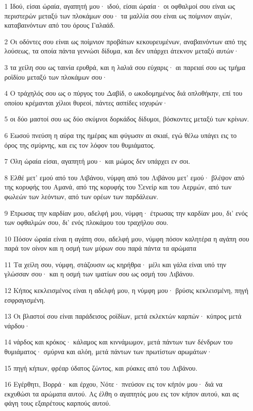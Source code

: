 \par 1 Ιδού, είσαι ώραία, αγαπητή μου· ιδού, είσαι ώραία· οι οφθαλμοί σου είναι ως περιστερών μεταξύ των πλοκάμων σου· τα μαλλία σου είναι ως ποίμνιον αιγών, καταβαινόντων από του όρους Γαλαάδ.
\par 2 Οι οδόντες σου είναι ως ποίμνιον προβάτων κεκουρευμένων, αναβαινόντων από της λούσεως, τα οποία πάντα γεννώσι δίδυμα, και δεν υπάρχει άτεκνον μεταξύ αυτών·
\par 3 τα χείλη σου ως ταινία ερυθρά, και η λαλιά σου εύχαρις· αι παρειαί σου ως τμήμα ροϊδίου μεταξύ των πλοκάμων σου·
\par 4 Ο τράχηλός σου ως ο πύργος του Δαβίδ, ο ωκοδομημένος διά οπλοθήκην, επί του οποίου κρέμανται χίλιοι θυρεοί, πάντες ασπίδες ισχυρών·
\par 5 οι δύο μαστοί σου ως δύο σκύμνοι δορκάδος δίδυμοι, βόσκοντες μεταξύ των κρίνων.
\par 6 Εωσού πνεύση η αύρα της ημέρας και φύγωσιν αι σκιαί, εγώ θέλω υπάγει εις το όρος της σμύρνης, και εις τον λόφον του θυμιάματος.
\par 7 Όλη ώραία είσαι, αγαπητή μου· και μώμος δεν υπάρχει εν σοι.
\par 8 Ελθέ μετ' εμού από του Λιβάνου, νύμφη από του Λιβάνου μετ' εμού· βλέψον από της κορυφής του Αμανά, από της κορυφής του Σενείρ και του Αερμών, από των φωλεών των λεόντων, από των ορέων των παρδάλεων.
\par 9 Έτρωσας την καρδίαν μου, αδελφή μου, νύμφη· έτρωσας την καρδίαν μου, δι' ενός των οφθαλμών σου, δι' ενός πλοκάμου του τραχήλου σου.
\par 10 Πόσον ώραία είναι η αγάπη σου, αδελφή μου, νύμφη πόσον καλητέρα η αγάπη σου παρά τον οίνον και η οσμή των μύρων σου παρά πάντα τα αρώματα
\par 11 Τα χείλη σου, νύμφη, στάζουσιν ως κηρήθρα· μέλι και γάλα είναι υπό την γλώσσαν σου· και η οσμή των ιματίων σου ως οσμή του Λιβάνου.
\par 12 Κήπος κεκλεισμένος είναι η αδελφή μου, η νύμφη μου· βρύσις κεκλεισμένη, πηγή εσφραγισμένη.
\par 13 Οι βλαστοί σου είναι παράδεισος ροϊδίων, μετά εκλεκτών καρπών· κύπρος μετά νάρδου·
\par 14 νάρδος και κρόκος· κάλαμος και κιννάμωμον, μετά πάντων των δένδρων του θυμιάματος· σμύρνα και αλόη, μετά πάντων των πρωτίστων αρωμάτων·
\par 15 πηγή κήπων, φρέαρ ύδατος ζώντος, και ρύακες από του Λιβάνου.
\par 16 Εγέρθητι, Βορρά· και έρχου, Νότε· πνεύσον εις τον κήπόν μου· διά να εκχυθώσι τα αρώματα αυτού. Ας έλθη ο αγαπητός μου εις τον κήπον αυτού, και ας φάγη τους εξαιρέτους καρπούς αυτού.

